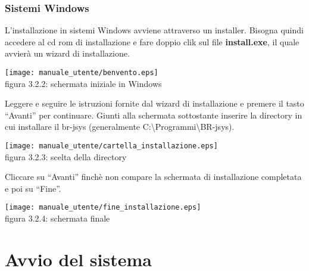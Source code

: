 \subsection{Sistemi Windows}
L'installazione in sistemi Windows avviene attraverso un installer. Bisogna quindi accedere al cd rom di installazione e fare doppio clik sul file  \textbf{install.exe}, il quale avvier\`a un wizard di installazione.
\begin{center}
\texttt{[image: manuale\_utente/benvento.eps]}\\
 figura 3.2.2: schermata iniziale in Windows
\end{center}
Leggere e seguire le istruzioni fornite dal wizard di installazione e premere il tasto ``Avanti'' per continuare.
Giunti alla schermata sottostante inserire la directory in cui installare il br-jsys (generalmente C:\textbackslash Programmi\textbackslash BR-jsys).
\begin{center}
\texttt{[image: manuale\_utente/cartella\_installazione.eps]}\\
 figura 3.2.3: scelta della directory
\end{center}
Cliccare su ``Avanti'' finch\`e non compare la schermata di installazione completata e poi su ``Fine''.
\begin{center}
\texttt{[image: manuale\_utente/fine\_installazione.eps]}\\
figura 3.2.4: schermata finale
\end{center}

\chapter{Avvio del sistema}
